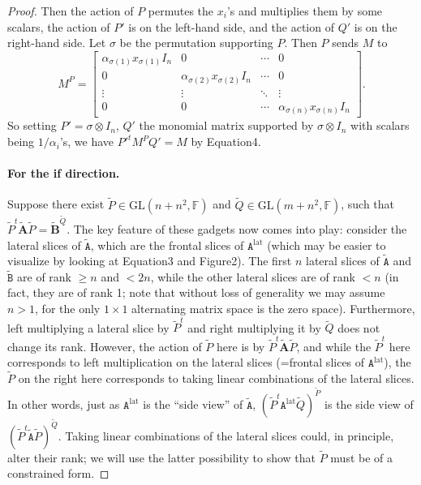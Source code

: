 \documentclass[10pt,a4paper]{article}
\begin{document}
\begin{proof}
Then the action of $P$ permutes the $x_i$'s and multiplies them by some scalars, the action of $P'$ is on the left-hand side, and the action of $Q'$ is on the right-hand side. Let $\sigma$ be the permutation supporting $P$. Then $P$ sends $M$ to
\[M^P=\begin{bmatrix}\alpha_{\sigma(1)}x_{\sigma(1)}I_n&0&\cdots&0\\0&\alpha_{\sigma(2)}x_{\sigma(2)}I_n&\cdots&0\\\vdots&\vdots&\ddots&\vdots\\0&0&\cdots&\alpha_{\sigma(n)}x_{\sigma(n)}I_n\end{bmatrix}.\]
So setting $P'=\sigma\otimes I_n$, $Q'$ the monomial matrix supported by $\sigma\otimes I_n$ with scalars being $1/\alpha_i$'s, we have $P'^tM^PQ'=M$ by Equation4.
\paragraph{For the if direction.}
Suppose there exist $\widetilde P\in\mathrm{GL}(n+n^2,\mathbb F)$ and $\widetilde Q\in\mathrm{GL}(m+n^2,\mathbb F)$, such that $\widetilde P^t\widetilde{\mathbf A}\widetilde P=\widetilde{\mathbf B}^{\widetilde Q}$. The key feature of these gadgets now comes into play: consider the lateral slices of $\widetilde{\mathtt A}$, which are the frontal slices of $\mathtt A^{\mathrm{lat}}$ (which may be easier to visualize by looking at Equation3 and Figure2). The first $n$ lateral slices of $\widetilde{\mathtt A}$ and $\widetilde{\mathtt B}$ are of rank $\ge n$ and $<2n$, while the other lateral slices are of rank $<n$ (in fact, they are of rank 1; note that without loss of generality we may assume $n>1$, for the only $1\times1$ alternating matrix space is the zero space). Furthermore, left multiplying a lateral slice by $\widetilde P^t$ and right multiplying it by $\widetilde Q$ does not change its rank. However, the action of $\widetilde P$ here is by $\widetilde P^t\widetilde{\mathbf A}\widetilde P$, and while the $\widetilde P^t$ here corresponds to left multiplication on the lateral slices (=frontal slices of $\mathtt A^{\mathrm{lat}}$), the $\widetilde P$ on the right here corresponds to taking linear combinations of the lateral slices. In other words, just as $\mathtt A^{\mathrm{lat}}$ is the ``side view'' of $\widetilde{\mathtt A}$, $(\widetilde P^t\mathtt A^{\mathrm{lat}}\widetilde Q)^{\widetilde P}$ is the side view of $(\widetilde P^t\widetilde{\mathtt A}\widetilde P)^{\widetilde Q}$. Taking linear combinations of the lateral slices could, in principle, alter their rank; we will use the latter possibility to show that $\widetilde P$ must be of a constrained form.

\end{proof}
\end{document}
